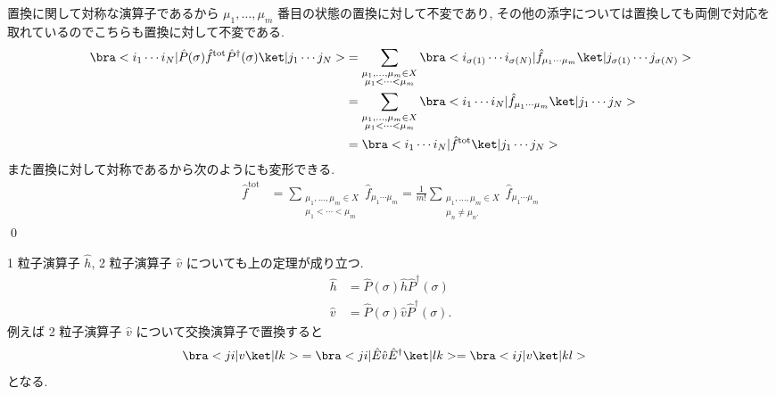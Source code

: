 \documentclass[uplatex,dvipdfmx,a4paper,11pt]{jlreq}
\makeatletter
\numberwithin{equation}{section}
\theoremstyle{definition}
\renewenvironment{proof}[1][\proofname]{\par
  \normalfont
  \topsep6\p@\@plus6\p@ \trivlist
  \item[\hskip\labelsep{\bfseries #1}\@addpunct{\bfseries}]\ignorespaces\quad\par
}{%
  \qed\endtrivlist\@endpefalse
}
\renewcommand\proofname{証明}
\makeatother
\begin{document}
\begin{proof}
  置換に関して対称な演算子であるから $\mu_1,\ldots,\mu_m$ 番目の状態の置換に対して不変であり, その他の添字については置換しても両側で対応を取れているのでこちらも置換に対して不変である.
  \begin{align}
    \bra<i_1\cdots i_N|\hat{P}(\sigma)\hat{f}^{\mathrm{tot}}\hat{P}^\dagger(\sigma)\ket|j_1\cdots j_N> & = \sum_{\substack{\mu_1,\ldots,\mu_m\in X                      \\ \mu_1 < \cdots < \mu_m }}\bra<i_{\sigma(1)}\cdots i_{\sigma(N)}|\hat{f}_{\mu_1\cdots\mu_m}\ket|j_{\sigma(1)}\cdots j_{\sigma(N)}> \\
                                                                                                       & = \sum_{\substack{\mu_1,\ldots,\mu_m\in X                      \\ \mu_1 < \cdots < \mu_m }}\bra<i_1\cdots i_N|\hat{f}_{\mu_1\cdots\mu_m}\ket|j_1\cdots j_N> \\
                                                                                                       & = \bra<i_1\cdots i_N|\hat{f}^{\mathrm{tot}}\ket|j_1\cdots j_N>
  \end{align}
  また置換に対して対称であるから次のようにも変形できる.
  \begin{align}
    \hat{f}^{\mathrm{tot}} & = \sum_{\substack{\mu_1,\ldots,\mu_m\in X \\ \mu_1 < \cdots < \mu_m}}\hat{f}_{\mu_1\cdots\mu_m} = \frac{1}{m!}\sum_{\substack{\mu_1,\ldots,\mu_m\in X \\ \mu_n \neq \mu_{n'}}}\hat{f}_{\mu_1\cdots\mu_m}
  \end{align}
\end{proof}
\begin{example}
  1 粒子演算子 $\hat{h}$, 2 粒子演算子 $\hat{v}$ についても上の定理が成り立つ.
  \begin{align}
    \hat{h} & = \hat{P}(\sigma)\hat{h}\hat{P}^\dagger(\sigma)  \\
    \hat{v} & = \hat{P}(\sigma)\hat{v}\hat{P}^\dagger(\sigma).
  \end{align}
  例えば 2 粒子演算子 $\hat{v}$ について交換演算子で置換すると
  \begin{align}
    \bra<ji|v\ket|lk> & = \bra<ji|\hat{E}\hat{v}\hat{E}^\dagger\ket|lk> = \bra<ij|v\ket|kl>
  \end{align}
  となる.
\end{example}
\end{document}
